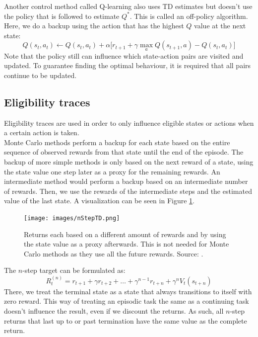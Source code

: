 \documentclass[a4paper]{article}
\begin{document}
Another control method called Q-learning also uses TD estimates but doesn't use the policy that is followed to estimate $Q^*$. This is called an off-policy algorithm. Here, we do a backup using the action that has the highest $Q$ value at the next state:
\begin{equation}
Q(s_t,a_t) \leftarrow Q(s_t,a_t) + \alpha \big[ r_{t+1} + \gamma \max_{a} Q(s_{t+1}, a) - Q(s_t,a_t) \big]
\end{equation}
Note that the policy still can influence which state-action pairs are visited and updated. To guarantee finding the optimal behaviour, it is required that all pairs continue to be updated.\\

\subsection{Eligibility traces}
Eligibility traces are used in order to only influence eligible states or actions when a certain action is taken.\\
Monte Carlo methods perform a backup for each state based on the entire sequence of observed rewards from that state until the end of the episode. The backup of more simple methods is only based on the next reward of a state, using the state value one step later as a proxy for the remaining rewards. An intermediate method would perform a backup based on an intermediate number of rewards. Then, we use the rewards of the intermediate steps and the estimated value of the last state. A visualization can be seen in Figure \ref{fig:nStepTD}.
\begin{figure}[H]
\texttt{[image: images/nStepTD.png]}
\caption{Returns each based on a different amount of rewards and by using the state value as a proxy afterwards. This is not needed for Monte Carlo methods as they use all the future rewards. Source: \cite{Sutton1998ReinforcementIntroductionb}.}
\label{fig:nStepTD}
\end{figure}
The $n$-step target can be formulated as:
\begin{equation}
R_t^{(n)} = r_{t+1} + \gamma r_{t+2} + \dots + \gamma^{n-1}r_{t+n} + \gamma^n V_t(s_{t+n})
\end{equation}
There, we treat the terminal state as a state that always transitions to itself with zero reward. This way of treating an episodic task the same as a continuing task doesn't influence the result, even if we discount the returns. As such, all $n$-step returns that last up to or past termination have the same value as the complete return.\\
\end{document}
